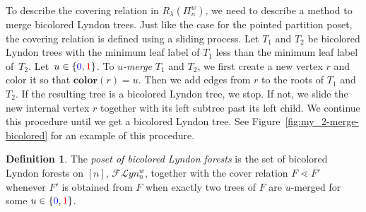 \documentclass[11pt]{article}
\theoremstyle{definition}
\newtheorem{defi}[theo]{Definition}
\numberwithin{equation}{section}
\newcommand{\Flyn}{\mathcal{FL}yn}
\newcommand{\clr}{\mathbf{color}}
\newcommand{\tre}[1]{{\color{red}{#1}}}
\newcommand{\tbl}[1]{{\color{blue}{#1}}}
\begin{document}
 To describe the covering relation in $R_\lambda(\Pi_n^w)$, we need to describe a method to merge bicolored Lyndon trees.  Just like the case for the pointed partition poset, the covering relation is defined using a sliding process.  Let $T_1$ and $T_2$ be bicolored Lyndon trees with the minimum leaf label of $T_1$ less than the minimum leaf label of~$T_2$. Let~$u\in \{\tbl{0},\tre{1}\}$. To \emph{$u$-merge} $T_1$ and $T_2$, we first create a new vertex $r$ and color it so that $\clr{(r)}=u$.  Then we add edges from $r$ to the roots of $T_1$ and $T_2$.  If the resulting tree is a bicolored Lyndon tree, we stop. If not, we slide the new internal vertex $r$ together with its left subtree past its left child. We continue this procedure until we get a bicolored Lyndon tree.  See Figure~\ref{fig:my_2-merge-bicolored} for an example of this procedure.




 \begin{defi}   The \emph{poset of bicolored Lyndon forests} is the set of bicolored Lyndon forests on $[n]$, $\Flyn_{n}^{w}$, together with the  cover relation $F\lessdot F'$   whenever $F'$ is obtained from $F$ when exactly two trees of $F$ are $u$-merged for some $u\in\left\{\tbl{0},\tre{1}\right\}$.
\end{defi}
\end{document}
